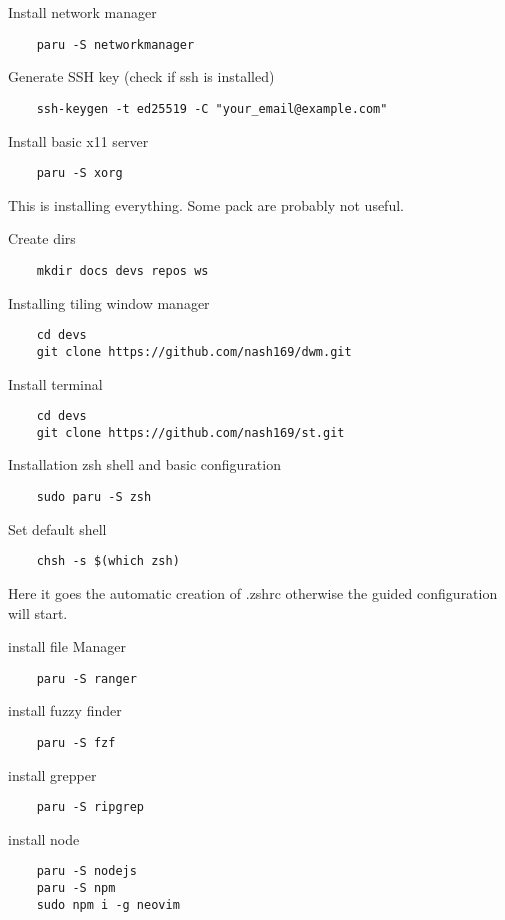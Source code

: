 \documentclass[12pt]{article}
\begin{document}
Install network manager
\begin{lstlisting}
    paru -S networkmanager
\end{lstlisting}

Generate SSH key (check if ssh is installed)
\begin{lstlisting}
    ssh-keygen -t ed25519 -C "your_email@example.com"
\end{lstlisting}
Install basic x11 server
\begin{lstlisting}
    paru -S xorg
\end{lstlisting}
This is installing everything. Some pack are probably not useful.

Create dirs
\begin{lstlisting}
    mkdir docs devs repos ws
\end{lstlisting}

Installing tiling window manager
\begin{lstlisting}
    cd devs
    git clone https://github.com/nash169/dwm.git
\end{lstlisting}

Install terminal
\begin{lstlisting}
    cd devs
    git clone https://github.com/nash169/st.git
\end{lstlisting}

Installation zsh shell and basic configuration
\begin{lstlisting}
    sudo paru -S zsh
\end{lstlisting}
Set default shell
\begin{lstlisting}
    chsh -s $(which zsh)
\end{lstlisting}
Here it goes the automatic creation of .zshrc otherwise the guided configuration will start.

install file Manager
\begin{lstlisting}
    paru -S ranger
\end{lstlisting}

install fuzzy finder
\begin{lstlisting}
    paru -S fzf
\end{lstlisting}

install grepper
\begin{lstlisting}
    paru -S ripgrep
\end{lstlisting}

install node
\begin{lstlisting}
    paru -S nodejs
	paru -S npm
    sudo npm i -g neovim
\end{lstlisting}
\end{document}
